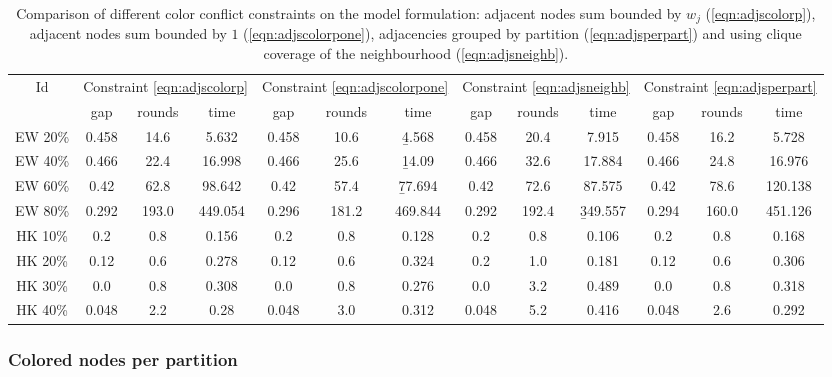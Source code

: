 \begin{sidewaystable}
\centering

	\begin{tabular}{|c|ccc|ccc|ccc|ccc|}
	\hline
	\multicolumn{1}{|c|}{Id} & \multicolumn{3}{|c|}{Constraint \ref{eqn:adjscolorp}} & \multicolumn{3}{|c|}{Constraint \ref{eqn:adjscolorpone}} & \multicolumn{3}{|c|}{Constraint \ref{eqn:adjsneighb}} & \multicolumn{3}{|c|}{Constraint \ref{eqn:adjsperpart}} 
	\\
	& gap & rounds & time & gap & rounds & time & gap & rounds & time & gap & rounds & time 
	\\
	\hline
	EW 20\% & 0.458 & 14.6 & 5.632 & 0.458 & 10.6 & \b{4.568} & 0.458 & 20.4 & 7.915 & 0.458 & 16.2 & 5.728
	\\
	EW 40\% & 0.466 & 22.4 & 16.998 & 0.466 & 25.6 & \b{14.09} & 0.466 & 32.6 & 17.884 & 0.466 & 24.8 & 16.976
	\\
	EW 60\% & 0.42 & 62.8 & 98.642 & 0.42 & 57.4 & \b{77.694} & 0.42 & 72.6 & 87.575 & 0.42 & 78.6 & 120.138
	\\
	EW 80\% & 0.292 & 193.0 & 449.054 & 0.296 & 181.2 & 469.844 & 0.292 & 192.4 & \b{349.557} & 0.294 & 160.0 & 451.126
	\\
	\hline
	HK 10\% &  0.2 &  0.8 & 0.156 &  0.2 &  0.8 & 0.128 &  0.2 &  0.8 & 0.106 &  0.2 &  0.8 & 0.168
	\\
	HK 20\% & 0.12 &  0.6 & 0.278 & 0.12 &  0.6 & 0.324 &  0.2 &  1.0 & 0.181 & 0.12 &  0.6 & 0.306
	\\
	HK 30\% &  0.0 &  0.8 & 0.308 &  0.0 &  0.8 & 0.276 &  0.0 &  3.2 & 0.489 &  0.0 &  0.8 & 0.318
	\\
	HK 40\% & 0.048 &  2.2 & 0.28 & 0.048 &  3.0 & 0.312 & 0.048 &  5.2 & 0.416 & 0.048 &  2.6 & 0.292
	\\
	\hline 
	 \end{tabular}
	
	\caption{Comparison of different color conflict constraints on the model formulation: adjacent nodes sum bounded by $w_j$ (\ref{eqn:adjscolorp}), adjacent nodes sum bounded by $1$ (\ref{eqn:adjscolorpone}), adjacencies grouped by partition (\ref{eqn:adjsperpart}) and using clique coverage of the neighbourhood (\ref{eqn:adjsneighb}).}
	\label{table:modelsadj}
\end{sidewaystable}

\subsubsection{Colored nodes per partition}

